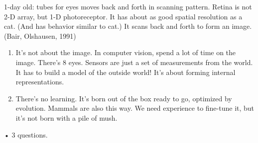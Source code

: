 1-day old: tubes for eyes moves back and forth in scanning pattern. Retina is not 2-D array, but 1-D photoreceptor. It has about as good spatial resolution as a cat. (And has behavior similar to cat.) It scans back and forth to form an image. (Bair, Olshausen, 1991)
\begin{enumerate}
\item
It's not about the image. In computer vision, spend a lot of time on the image. There's 8 eyes. Sensors are just a set of measurements from the world. It has to build a model of the outside world! It's about forming internal representations.
\item
There's no learning. It's born out of the box ready to go, optimized by evolution. Mammals are also this way. We need experience to fine-tune it, but it's not born with a pile of mush. 
\end{enumerate}•
3 questions.
